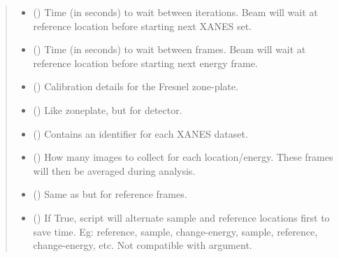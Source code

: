 \documentclass[letterpaper,10pt,english]{sphinxmanual}
\begin{document}
\begin{fulllineitems}
\begin{quote}
\begin{description}
\begin{itemize}
\item {} 
 (\sphinxstyleliteralemphasis{, }) \textendash{} Time (in seconds) to wait between iterations. Beam will wait at
reference location before starting next XANES set.

\item {} 
 (\sphinxstyleliteralemphasis{, }) \textendash{} Time (in seconds) to wait between frames. Beam will wait at
reference location before starting next energy frame.

\item {} 
 ({\hyperref[\detokenize{xanespy:xanespy.beamlines.Zoneplate}]{}}) \textendash{} Calibration details for the Fresnel zone-plate.

\item {} 
 ({\hyperref[\detokenize{xanespy:xanespy.beamlines.Detector}]{}}) \textendash{} Like zoneplate, but for detector.

\item {} 
 () \textendash{} Contains an identifier for each XANES dataset.

\item {} 
 (\sphinxstyleliteralemphasis{, }) \textendash{} How many images to collect for each location/energy. These
frames will then be averaged during analysis.

\item {} 
 (\sphinxstyleliteralemphasis{, }) \textendash{} Same as  but for reference frames.

\item {} 
 (\sphinxstyleliteralemphasis{, }) \textendash{} If True, script will alternate sample and reference locations
first to save time. Eg: reference, sample, change-energy,
sample, reference, change-energy, etc. Not compatible with
 argument.

\end{itemize}

\end{description}\end{quote}

\end{fulllineitems}
\end{document}
